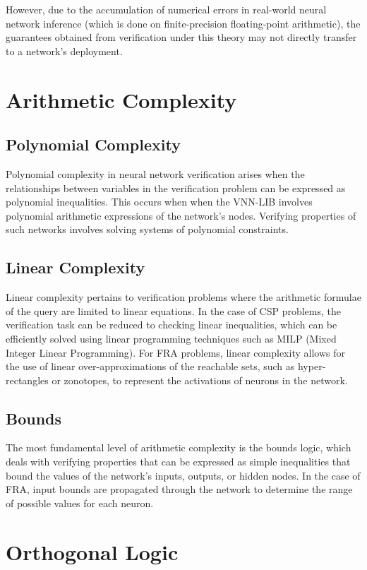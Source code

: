 However, due to the accumulation of numerical errors in real-world neural network inference (which is done on finite-precision floating-point arithmetic), 
the guarantees obtained from verification under this theory may not directly transfer to a network's deployment. 

\section{Arithmetic Complexity}

\subsection*{Polynomial Complexity}
Polynomial complexity in neural network verification arises when the relationships between variables in the verification problem can be expressed as polynomial inequalities. 
This occurs when when the VNN-LIB involves polynomial arithmetic expressions of the network's nodes. Verifying properties of such networks involves solving systems of polynomial constraints.

\subsection*{Linear Complexity}
Linear complexity pertains to verification problems where the arithmetic formulae of the query are limited to linear equations. In the case of CSP problems, the verification task can be reduced 
to checking linear inequalities, which can be efficiently solved using linear programming techniques such as MILP (Mixed Integer Linear Programming). For FRA problems, linear complexity allows 
for the use of linear over-approximations of the reachable sets, such as hyper-rectangles or zonotopes, to represent the activations of neurons in the network.

\subsection*{Bounds}
The most fundamental level of arithmetic complexity is the bounds logic, which deals with verifying properties that can be expressed as simple inequalities that bound the values of the network's 
inputs, outputs, or hidden nodes. In the case of FRA, input bounds are propagated through the network to determine the range of possible values for each neuron.

\section{Orthogonal Logic}

